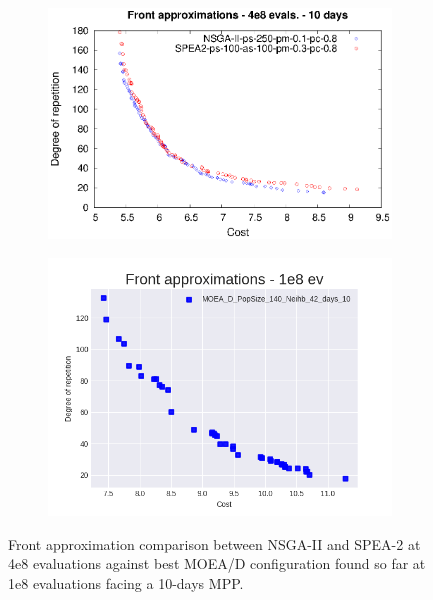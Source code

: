 \begin{figure}[H]
\begin{subfigure}{.5\textwidth}
  \centering
  \includegraphics[width=1.0\linewidth]{../references/fronts_10days.eps}
\end{subfigure}%
\begin{subfigure}{.5\textwidth}
  \centering
  \includegraphics[width=1.0\linewidth]{../experiments/plots/fronts/10_days/MOEA_D_PopSize_140_Neihb_42_days_10_10.png}
\end{subfigure}
\caption{Front approximation comparison between NSGA-II and SPEA-2 at 4e8 evaluations against best MOEA/D configuration found so far at 1e8 evaluations facing a 10-days MPP.}
\label{fig:front_comp_2}
\end{figure}


%